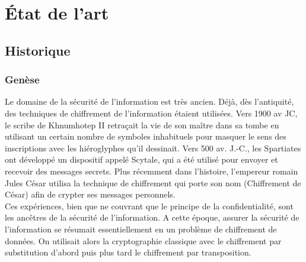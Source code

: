 \chapter{État de l'art}
\minitoc
\clearpage

\section{Historique}

\subsection{Genèse}
Le domaine de la sécurité de l'information est très ancien. Déjà, dès l’antiquité, des techniques de chiffrement de l’information étaient utilisées. Vers 1900 av JC, le scribe de Khnumhotep II retraçait la vie de son maître dans sa tombe en utilisant un certain nombre de symboles inhabituels pour masquer le sens des inscriptions avec les hiéroglyphes qu’il dessinait. Vers 500 av. J.-C., les Spartiates ont développé un dispositif appelé Scytale, qui a été utilisé pour envoyer et recevoir des messages secrets. Plus récemment dans l’histoire, l’empereur romain Jules César utilisa la technique de chiffrement qui porte son nom (Chiffrement de César) afin de crypter ses messages personnels. \cite{cours-crypto-mendy}\\
Ces expériences, bien que ne couvrant que le principe de la confidentialité, sont les ancêtres de la sécurité de l’information. A cette époque, assurer la sécurité de l’information se résumait essentiellement en un problème de chiffrement de données. On utilisait alors la cryptographie classique avec le chiffrement par substitution d’abord  puis plus tard le chiffrement par transposition.

